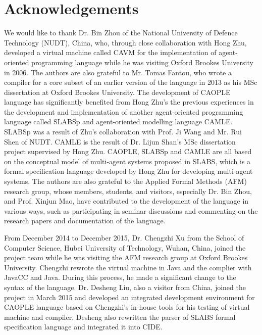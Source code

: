 \documentclass[english]{report}
\begin{document}
\chapter*{Acknowledgements}

We would like to thank Dr. Bin Zhou of the National University of Defence Technology (NUDT), China, who, through close collaboration with Hong Zhu, developed a virtual machine called CAVM for the implementation of agent-oriented programming language while he was visiting Oxford Brookes University in 2006. The authors are also grateful to Mr. Tomas Fantou, who wrote a compiler for a core subset of an earlier version of the language in 2013 as his MSc dissertation at Oxford Brookes University. The development of CAOPLE language has significantly benefited from Hong Zhu's the previous experiences in the development and implementation of another agent-oriented programming language called SLABSp and agent-oriented modelling language CAMLE. SLABSp was a result of Zhu's collaboration with Prof. Ji Wang and Mr. Rui Shen of NUDT. CAMLE is the result of Dr. Lijun Shan's MSc dissertation project supervised by Hong Zhu. CAOPLE, SLABSp and CAMLE are all based on the conceptual model of multi-agent systems proposed in SLABS, which is a formal specification language developed by Hong Zhu for developing multi-agent systems. The authors are also grateful to the Applied Formal Methods (AFM) research group, whose members, students, and visitors, especially Dr. Bin Zhou, and Prof. Xinjun Mao, have contributed to the development of the language in various ways, such as participating in seminar discussions and commenting on the research papers and documentation of the language. 

From December 2014 to December 2015, Dr. Chengzhi Xu from the School of Computer Science, Hubei University of Technology, Wuhan, China, joined the project team while he was visiting the AFM research group at Oxford Brookes University. Chengzhi rewrote the virtual machine in Java and the complier with JavaCC and Java. During this process, he made a significant change to the syntax of the language. Dr. Desheng Liu, also a visitor from China, joined the project in March 2015 and developed an integrated development environment for CAOPLE language based on Chengzhi's in-house tools for his testing of virtual machine and compiler. Desheng also rewritten the parser of SLABS formal specification language and integrated it into CIDE. 
\end{document}

